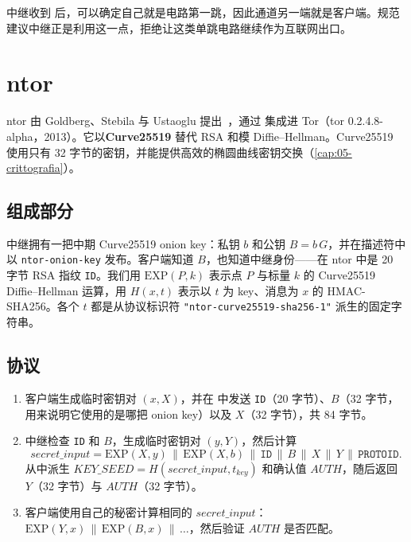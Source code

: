 \begin{attenzione}
中继收到  后，可以确定自己就是电路第一跳，因此通道另一端就是客户端。规范建议中继正是利用这一点，拒绝让这类单跳电路继续作为互联网出口。
\end{attenzione}

\section{ntor}\label{sec:ntor}

ntor 由 Goldberg、Stebila 与 Ustaoglu 提出~\cite{goldberg2013ntor}，通过  集成进 Tor（tor 0.2.4.8-alpha，2013）。它以\textbf{Curve25519} 替代 RSA 和模 Diffie--Hellman。Curve25519 使用只有 32 字节的密钥，并能提供高效的椭圆曲线密钥交换（\cref{cap:05-crittografia}）。

\subsection{组成部分}

中继拥有一把中期 Curve25519 onion key：私钥 $b$ 和公钥 $B = b\,G$，并在描述符中以 \texttt{ntor-onion-key} 发布。客户端知道 $B$，也知道中继身份——在 ntor 中是 20 字节 RSA 指纹 \texttt{ID}。我们用 $\mathrm{EXP}(P,k)$ 表示点 $P$ 与标量 $k$ 的 Curve25519 Diffie--Hellman 运算，用 $H(x,t)$ 表示以 $t$ 为 key、消息为 $x$ 的 HMAC-SHA256。各个 $t$ 都是从协议标识符 \texttt{"ntor-curve25519-sha256-1"} 派生的固定字符串。

\subsection{协议}

\begin{enumerate}
  \item 客户端生成临时密钥对 $(x,X)$，并在  中发送 \texttt{ID}（20 字节）、$B$（32 字节，用来说明它使用的是哪把 onion key）以及 $X$（32 字节），共 84 字节。
  \item 中继检查 \texttt{ID} 和 $B$，生成临时密钥对 $(y,Y)$，然后计算
  \[ \mathit{secret\_input} = \mathrm{EXP}(X, y) \,\|\, \mathrm{EXP}(X, b) \,\|\, \texttt{ID} \,\|\, B \,\|\, X \,\|\, Y \,\|\, \texttt{PROTOID}. \]
  从中派生 $\mathit{KEY\_SEED} = H(\mathit{secret\_input}, t_{\mathit{key}})$ 和确认值 $\mathit{AUTH}$，随后返回 $Y$（32 字节）与 $\mathit{AUTH}$（32 字节）。
  \item 客户端使用自己的秘密计算相同的 $\mathit{secret\_input}$：$\mathrm{EXP}(Y,x) \,\|\,\allowbreak \mathrm{EXP}(B,x) \,\|\, \ldots$，然后验证 $\mathit{AUTH}$ 是否匹配。
\end{enumerate}

